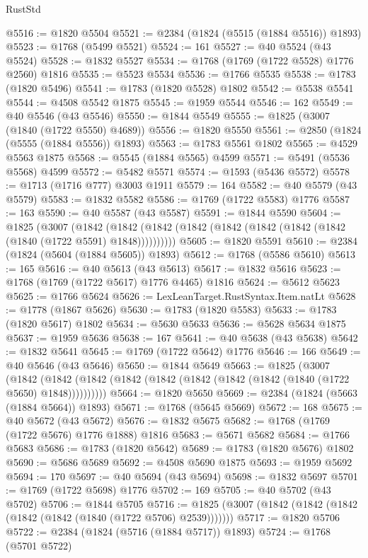 \begin{lexlean}{RustStd}
\begin{coremodule}
{\begin{coremodule}
{{{{{{{{{{{{{{{{{{{{{{{{{{{{{{{{{{{{{{{{{{{{{{{@5516 := @1820 @5504
@5521 := @2384 (@1824 (@5515 (@1884 @5516)) @1893)
@5523 := @1768 (@5499 @5521)
@5524 := 161
@5527 := @40 @5524 (@43 @5524)
@5528 := @1832 @5527
@5534 := @1768 (@1769 (@1722 @5528) @1776 @2560) @1816
@5535 := @5523 @5534
@5536 := @1766 @5535
@5538 := @1783 (@1820 @5496)
@5541 := @1783 (@1820 @5528) @1802
@5542 := @5538 @5541
@5544 := @4508 @5542 @1875
@5545 := @1959 @5544
@5546 := 162
@5549 := @40 @5546 (@43 @5546)
@5550 := @1844 @5549
@5555 := @1825 (@3007 (@1840 (@1722 @5550) @4689))
@5556 := @1820 @5550
@5561 := @2850 (@1824 (@5555 (@1884 @5556)) @1893)
@5563 := @1783 @5561 @1802
@5565 := @4529 @5563 @1875
@5568 := @5545 (@1884 @5565) @4599
@5571 := @5491 (@5536 @5568) @4599
@5572 := @5482 @5571
@5574 := @1593 (@5436 @5572)
@5578 := @1713 (@1716 @777) @3003 @1911
@5579 := 164
@5582 := @40 @5579 (@43 @5579)
@5583 := @1832 @5582
@5586 := @1769 (@1722 @5583) @1776
@5587 := 163
@5590 := @40 @5587 (@43 @5587)
@5591 := @1844 @5590
@5604 := @1825
    (@3007
      (@1842 (@1842 (@1842 (@1842 (@1842 (@1842 (@1842 (@1842 (@1840 (@1722 @5591) @1848))))))))))
@5605 := @1820 @5591
@5610 := @2384 (@1824 (@5604 (@1884 @5605)) @1893)
@5612 := @1768 (@5586 @5610)
@5613 := 165
@5616 := @40 @5613 (@43 @5613)
@5617 := @1832 @5616
@5623 := @1768 (@1769 (@1722 @5617) @1776 @4465) @1816
@5624 := @5612 @5623
@5625 := @1766 @5624
@5626 := LexLeanTarget.RustSyntax.Item.natLt
@5628 := @1778 (@1867 @5626)
@5630 := @1783 (@1820 @5583)
@5633 := @1783 (@1820 @5617) @1802
@5634 := @5630 @5633
@5636 := @5628 @5634 @1875
@5637 := @1959 @5636
@5638 := 167
@5641 := @40 @5638 (@43 @5638)
@5642 := @1832 @5641
@5645 := @1769 (@1722 @5642) @1776
@5646 := 166
@5649 := @40 @5646 (@43 @5646)
@5650 := @1844 @5649
@5663 := @1825
    (@3007
      (@1842 (@1842 (@1842 (@1842 (@1842 (@1842 (@1842 (@1842 (@1840 (@1722 @5650) @1848))))))))))
@5664 := @1820 @5650
@5669 := @2384 (@1824 (@5663 (@1884 @5664)) @1893)
@5671 := @1768 (@5645 @5669)
@5672 := 168
@5675 := @40 @5672 (@43 @5672)
@5676 := @1832 @5675
@5682 := @1768 (@1769 (@1722 @5676) @1776 @1888) @1816
@5683 := @5671 @5682
@5684 := @1766 @5683
@5686 := @1783 (@1820 @5642)
@5689 := @1783 (@1820 @5676) @1802
@5690 := @5686 @5689
@5692 := @4508 @5690 @1875
@5693 := @1959 @5692
@5694 := 170
@5697 := @40 @5694 (@43 @5694)
@5698 := @1832 @5697
@5701 := @1769 (@1722 @5698) @1776
@5702 := 169
@5705 := @40 @5702 (@43 @5702)
@5706 := @1844 @5705
@5716 := @1825 (@3007 (@1842 (@1842 (@1842 (@1842 (@1842 (@1840 (@1722 @5706) @2539)))))))
@5717 := @1820 @5706
@5722 := @2384 (@1824 (@5716 (@1884 @5717)) @1893)
@5724 := @1768 (@5701 @5722)
}}}}}}}}}}}}}}}}}}}}}}}}}}}}}}}}}}}}}}}}}}}}}}}
\end{coremodule}}
\end{coremodule}
\end{lexlean}
